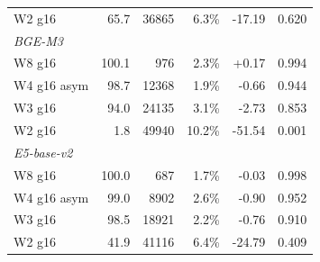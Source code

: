 \begin{table}[t]
\begin{tabular}{lrrrrr}
\quad W2 g16 & 65.7 & 36865 & 6.3\% & -17.19 & 0.620 \\
\multicolumn{5}{l}{\emph{BGE-M3}} \\
\quad W8 g16 & 100.1 & 976 & 2.3\% & +0.17 & 0.994 \\
\quad W4 g16 asym & 98.7 & 12368 & 1.9\% & -0.66 & 0.944 \\
\quad W3 g16 & 94.0 & 24135 & 3.1\% & -2.73 & 0.853 \\
\quad W2 g16 & 1.8 & 49940 & 10.2\% & -51.54 & 0.001 \\
\multicolumn{5}{l}{\emph{E5-base-v2}} \\
\quad W8 g16 & 100.0 & 687 & 1.7\% & -0.03 & 0.998 \\
\quad W4 g16 asym & 99.0 & 8902 & 2.6\% & -0.90 & 0.952 \\
\quad W3 g16 & 98.5 & 18921 & 2.2\% & -0.76 & 0.910 \\
\quad W2 g16 & 41.9 & 41116 & 6.4\% & -24.79 & 0.409 \\
\bottomrule
\end{tabular}\end{table}